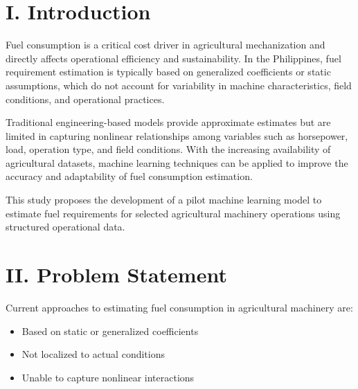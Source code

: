 \documentclass[11pt,twocolumn]{article}
\begin{document}

\section*{I. Introduction}

\vspace{10pt}

Fuel consumption is a critical cost driver in agricultural mechanization and directly affects operational efficiency and sustainability. In the Philippines, fuel requirement estimation is typically based on generalized coefficients or static assumptions, which do not account for variability in machine characteristics, field conditions, and operational practices.

\vspace{10pt}

Traditional engineering-based models provide approximate estimates but are limited in capturing nonlinear relationships among variables such as horsepower, load, operation type, and field conditions. With the increasing availability of agricultural datasets, machine learning techniques can be applied to improve the accuracy and adaptability of fuel consumption estimation.

\vspace{10pt}

This study proposes the development of a pilot machine learning model to estimate fuel requirements for selected agricultural machinery operations using structured operational data.

\section*{II. Problem Statement}

\vspace{10pt}

Current approaches to estimating fuel consumption in agricultural machinery are:
\begin{itemize}
\item Based on static or generalized coefficients
\item Not localized to actual conditions
\item Unable to capture nonlinear interactions
\end{itemize}
\end{document}
